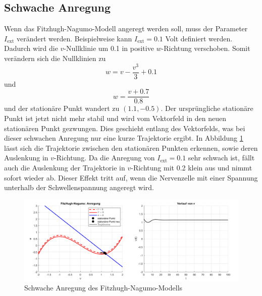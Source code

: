 \subsection{Schwache Anregung}
Wenn das Fitzhugh-Nagumo-Modell angeregt werden soll, muss der Parameter $I_\text{ext}$ verändert werden.
Beispielweise kann $I_\text{ext} = 0.1$ Volt definiert werden.
Dadurch wird die $v$-Nullklinie um 0.1 in positive $w$-Richtung verschoben.
Somit verändern sich die Nullklinien zu \[ w = v - \frac{v^3}{3} + 0.1\]
und \[w = \frac{v + 0.7}{0.8}\] und der stationäre Punkt wandert zu $(1.1 ,-0.5)$.
Der ursprüngliche stationäre Punkt ist jetzt nicht mehr stabil und wird vom Vektorfeld in den neuen stationären Punkt
gezwungen.
Dies geschieht entlang des Vektorfelds, was bei dieser schwachen Anregung nur eine kurze Trajektorie ergibt.
In Abbildung \ref{fig:schwacheAnregung} lässt sich die Trajektorie zwischen den stationären Punkten erkennen, sowie
deren Auslenkung in $v$-Richtung.
Da die Anregung von $I_\text{ext} = 0.1$ sehr schwach ist, fällt auch die Auslenkung der Trajektorie in $v$-Richtung mit 0.2 klein aus und
nimmt sofort wieder ab. 
Dieser Effekt tritt auf, wenn die Nervenzelle mit einer Spannung unterhalb der Schwellenspannung angeregt wird.
\begin{figure}
    \centering
    \includegraphics[width=\textwidth]{papers/nerven/Bilder/schwacheAnregung.png}
    \caption{Schwache Anregung des Fitzhugh-Nagumo-Modells}
    \label{fig:schwacheAnregung}
\end{figure}
